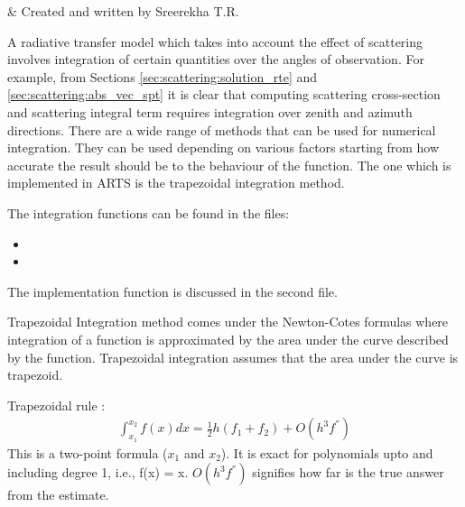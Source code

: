 \label{sec:integration}

 & Created and written by Sreerekha T.R.\\
\stophistory

%
%
A radiative transfer model which takes into account the effect of
scattering involves integration of certain quantities over the angles
of observation.  For example, from Sections
\ref{sec:scattering:solution_rte} and
\ref{sec:scattering:abs_vec_spt} it is clear that computing  
scattering cross-section  and scattering integral term requires
integration over zenith and azimuth directions. There are a wide range of
methods that can be used for numerical integration. They can be used
depending on various factors starting from how accurate the result
should be to the behaviour of the function. The one which is
implemented in ARTS is the trapezoidal integration method. 


\label{sec:integration:files}

The integration functions can be found in the files:
\begin{itemize}
\item {}
\item {}
\end{itemize}
The implementation function is
discussed in the second file. 

\label{sec:integration:trapezoidal}

Trapezoidal Integration method comes under the Newton-Cotes formulas
where integration of a function is approximated by the area under the
curve described by the function.  Trapezoidal integration assumes that
the area under the curve is trapezoid.  

Trapezoidal rule : 
\begin{eqnarray}
\label{eq:trapezoidal_rule}
{\int_{x_1}^{x_2} f(x)dx}  = \frac{1}{2} h (f_1 + f_2) + O(h^3 f^{''})
\end{eqnarray}
This is a two-point formula ($x_1$ and $x_2$).  It is exact for
polynomials upto and including degree 1, i.e., f(x) = x. $O(h^3
f^{''})$ signifies how far is the true answer from the estimate. 

